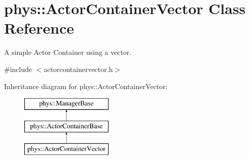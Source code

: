 \hypertarget{classphys_1_1ActorContainerVector}{
\section{phys::ActorContainerVector Class Reference}
\label{d3/d64/classphys_1_1ActorContainerVector}
}


A simple Actor Container using a vector.  




{\ttfamily \#include $<$actorcontainervector.h$>$}

Inheritance diagram for phys::ActorContainerVector:\begin{figure}[H]
\begin{center}
\leavevmode
\includegraphics[height=3cm]{d3/d64/classphys_1_1ActorContainerVector}
\end{center}
\end{figure}
